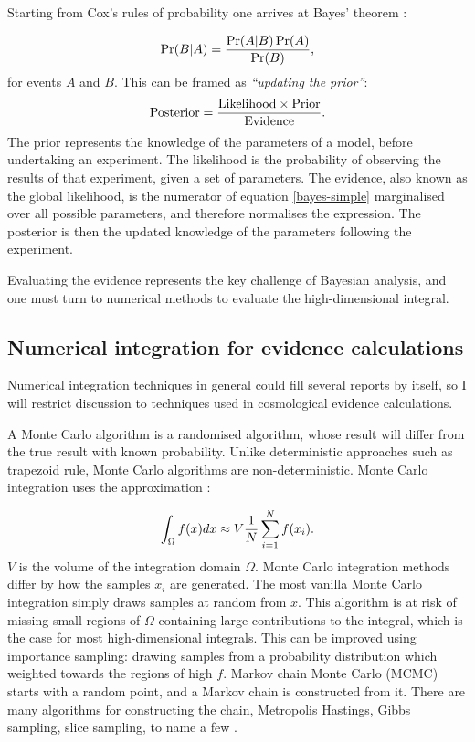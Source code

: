 \documentclass{article}
\begin{document}
Starting from Cox's rules of probability one arrives at Bayes' theorem \cite{Sivia2006}:

\begin{equation}
  \Pr({B|A}) = \frac{\Pr(A|B)\Pr(A)}{\Pr(B)} \textrm,
\end{equation}
%
for events $A$ and $B$. This can be framed as \textit{``updating the prior''}:
\begin{equation}
  \label{bayes-simple}
  \textrm{Posterior} = \frac{\textrm{Likelihood} \times \textrm{Prior}}{\textrm{Evidence}} \textrm .
\end{equation}
%
The prior represents the knowledge of the parameters of a model, before undertaking an experiment. The likelihood is the probability of observing the results of that experiment, given a set of parameters. The evidence, also known as the global likelihood, is the numerator of equation \ref{bayes-simple} marginalised over all possible parameters, and therefore normalises the expression. The posterior is then the updated knowledge of the parameters following the experiment.

Evaluating the evidence represents the key challenge of Bayesian analysis, and one must turn to numerical methods to evaluate the high-dimensional integral. 

\subsection{Numerical integration for evidence calculations}
Numerical integration techniques in general could fill several reports by itself, so I will restrict discussion to techniques used in cosmological evidence calculations.

A Monte Carlo algorithm is a randomised algorithm, whose result will differ from the true result with known probability. Unlike deterministic approaches such as trapezoid rule, Monte Carlo algorithms are non-deterministic. Monte Carlo integration uses the approximation \cite{intro-to-mc}:

\begin{equation}
\int_\Omega f(x) dx \approx V \frac{1}{N}\sum_{i=1}^{N} f(x_i) \textrm.
\end{equation}
%
$V$ is the volume of the integration domain $\Omega$. Monte Carlo integration methods differ by how the samples $x_i$ are generated. The most vanilla Monte Carlo integration simply draws samples at random from $x$. This algorithm is at risk of missing small regions of $\Omega$ containing large contributions to the integral, which is the case for most high-dimensional integrals. This can be improved using importance sampling: drawing samples from a probability distribution which weighted towards the regions of high $f$. Markov chain Monte Carlo (MCMC) starts with a random point, and a Markov chain is constructed from it. There are many algorithms for constructing the chain, Metropolis Hastings, Gibbs sampling, slice sampling, to name a few \cite{mc-sampling-methods}. 
\end{document}
